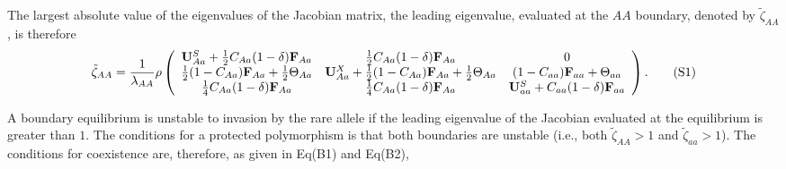 \documentclass[11pt]{article}
\newcommand\numberthis{\addtocounter{equation}{1}\tag{\theequation}}
\def\mbf#1{\mathbf{#1}}
\def\mcal#1{\mathcal{#1}}
\begin{document}
 The largest absolute value of the eigenvalues of the Jacobian matrix, the leading eigenvalue, evaluated at the $AA$ boundary, denoted by $\tilde{\zeta}_{AA}$, is therefore
{
\footnotesize
\begin{align*} \label{eq:eigAAFull}
	\tilde{\zeta}_{AA} = 
		\frac{1}{\lambda_{AA}}\rho\left(\begin{array}{ccc}
\mathbf{U}^S_{Aa} +\frac{1}{2} C_{Aa} (1 - \delta) \mbf{F}_{Aa} & \frac{1}{2} C_{Aa} (1 - \delta) \mbf{F}_{Aa}  & 0 \\
 \frac{1}{2} (1 - C_{Aa}) \mbf{F}_{Aa}+\frac{1}{2}  \Theta_{Aa} &\mathbf{U}^X_{Aa} + \frac{1}{2} (1 - C_{Aa}) \mbf{F}_{Aa} +\frac{1}{2}\Theta_{Aa} & (1-C_{aa})\mbf{F}_{aa} + \Theta_{aa}\\
  \frac{1}{4} C_{Aa} (1 - \delta) \mbf{F}_{Aa} & \frac{1}{4} C_{Aa} (1 - \delta) \mbf{F}_{Aa}  &\mathbf{U}^S_{aa} +C_{aa} (1 - \delta) \mbf{F}_{aa}  \\ 
			\end{array} \right). \numberthis
\end{align*}
}



A boundary equilibrium is unstable to invasion by the rare allele if the leading eigenvalue of the Jacobian evaluated at the equilibrium is greater than $1$. The conditions for a protected polymorphism is that both boundaries are unstable (i.e., both $\tilde{\zeta}_{AA} > 1$ and $\tilde{\zeta}_{aa} > 1$). The conditions for coexistence are, therefore, as given in Eq(B1) and Eq(B2),
\end{document}
